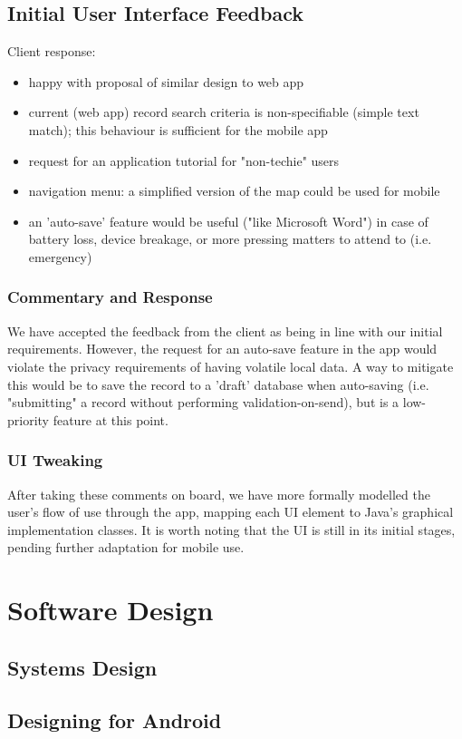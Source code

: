 \documentclass[12pt,a4paper,oneside,titlepage]{article}
\begin{document}
\subsection{Initial User Interface Feedback}
Client response:
\begin{itemize}
	\item happy with proposal of similar design to web app
	\item current (web app) record search criteria is non-specifiable (simple text match); this behaviour is sufficient for the mobile app
	\item request for an application tutorial for "non-techie" users
	\item navigation menu: a simplified version of the map could be used for mobile
	\item an 'auto-save' feature would be useful ("like Microsoft Word") in case of battery loss, device breakage, or more pressing matters to attend to (i.e. emergency)
\end{itemize}
\subsubsection{Commentary and Response}
We have accepted the feedback from the client as being in line with our initial requirements. However, the request for an auto-save feature in the app would violate the privacy requirements of having volatile local data. A way to mitigate this would be to save the record to a 'draft' database when auto-saving (i.e. "submitting" a record without performing validation-on-send), but is a low-priority feature at this point.
\subsubsection{UI Tweaking}
After taking these comments on board, we have more formally modelled the user's flow of use through the app, mapping each UI element to Java's graphical implementation classes. It is worth noting that the UI is still in its initial stages, pending further adaptation for mobile use.

\newpage
\section{Software Design}
\subsection{Systems Design}
\subsection{Designing for Android}
\end{document}
